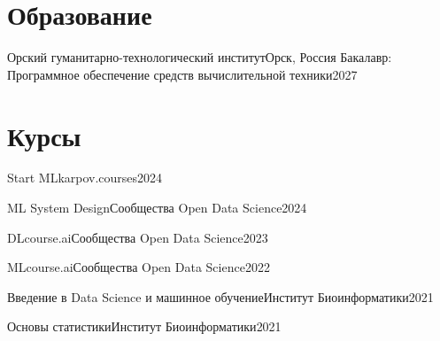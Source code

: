 \section{Образование}
  \resumeSubHeadingListStart

    \resumeSubheading
    {Орский гуманитарно-технологический институт}{Орск, Россия}
    {Бакалавр: Программное обеспечение средств вычислительной техники}{2027}
      
  \resumeSubHeadingListEnd

\section{Курсы}
  \resumeSubHeadingListStart

    \resumeSubheading
    {Start ML}{karpov.courses}{2024}
    
    \resumeSubheading
    {ML System Design}{Сообщества Open Data Science}{2024}
    
    \resumeSubheading
    {DLcourse.ai}{Сообщества Open Data Science}{2023}
    
    \resumeSubheading
    {MLcourse.ai}{Сообщества Open Data Science}{2022}

    \resumeSubheading
    {Введение в Data Science и машинное обучение}{Институт Биоинформатики}{2021}

    \resumeSubheading
    {Основы статистики}{Институт Биоинформатики}{2021}
    
  \resumeSubHeadingListEnd